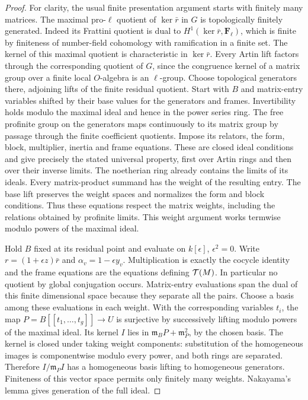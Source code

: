 \begin{proof}
For clarity, the usual finite presentation argument starts with finitely
many matrices. The maximal pro-\(\ell\) quotient of \(\ker\bar r\) in
\(G\) is topologically finitely generated. Indeed its Frattini quotient
is dual to \(H^1(\ker\bar r,\mathbf F_\ell)\), which is finite by
finiteness of number-field cohomology with ramification in a finite
set. The kernel of this maximal quotient is characteristic in
\(\ker\bar r\). Every Artin lift factors through the corresponding
quotient of \(G\), since the congruence kernel of a matrix group over
a finite local \(O\)-algebra is an \(\ell\)-group. Choose topological
generators there, adjoining lifts of the finite residual quotient.
Start with \(B\) and matrix-entry variables shifted by their base
values for the generators and frames. Invertibility holds modulo the
maximal ideal and hence in the power series ring. The free profinite
group on the generators maps continuously to its matrix group by
passage through the finite coefficient quotients. Impose its relators,
the form, block, multiplier, inertia and frame equations. These are
closed ideal conditions and give precisely the stated universal
property, first over Artin rings and then over their inverse limits.
The noetherian ring already contains the limits of its ideals.
Every matrix-product summand has the weight of the resulting entry.
The base lift preserves the weight spaces and normalizes the form and
block conditions. Thus these equations respect the matrix weights,
including the relations obtained by profinite limits. This weight
argument works termwise modulo powers of the maximal ideal.

Hold \(B\) fixed at its residual point and evaluate on \(k[\epsilon]\),
\(\epsilon^2=0\). Write \(r=(1+\epsilon z)\bar r\) and
\(\alpha_v=1-\epsilon y_v\). Multiplication is exactly the cocycle
identity and the frame equations are the equations defining
\({\cal T}(M)\). In particular no quotient by global conjugation
occurs. Matrix-entry evaluations span the dual of this finite
dimensional space because they separate all the pairs. Choose a basis
among these evaluations in each weight. With the corresponding
variables \(t_i\), the map \(P=B[[t_1,\ldots,t_g]]\to U\) is
surjective by successively lifting modulo powers of the maximal ideal.
Its kernel \(I\) lies in \(\mathfrak m_B P+\mathfrak m_P^2\), by the
chosen basis. The kernel is closed under taking weight components:
substitution of the homogeneous images is componentwise modulo every
power, and both rings are separated. Therefore \(I/\mathfrak m_PI\)
has a homogeneous basis lifting to homogeneous generators. Finiteness
of this vector space permits only finitely many weights. Nakayama's
lemma gives generation of the full ideal.


\end{proof}

